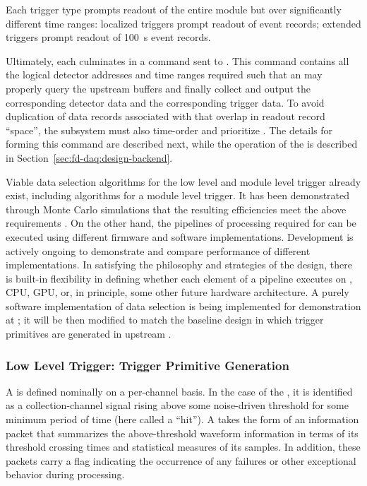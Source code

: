 \noindent Each trigger type prompts readout
of the entire module but over significantly different time
ranges: localized triggers prompt readout of \spreadout event records; extended
triggers prompt readout of \SI{100}{\second} event records. 

Ultimately, each  culminates in a command sent to . 
This command contains all the logical detector addresses and time ranges
required such that an  may properly query the upstream 
buffers and finally collect and output the corresponding detector data
and the corresponding trigger data. To avoid duplication of data
records associated with  that overlap in readout
record ``space'', the  subsystem must also time-order and
prioritize . The details for forming this
command are described next, while the operation of the  is
described in Section~\ref{sec:fd-daq:design-backend}.

Viable data selection algorithms for the low level and module level trigger already exist, including
algorithms for a module level  trigger.  It has
been demonstrated through Monte Carlo simulations that the resulting efficiencies meet the above
requirements \cite{bib:docdb11215,bib:docdb14522}. On the other hand, the pipelines of processing required
for  can be executed using different firmware and software
implementations. Development is actively ongoing to demonstrate
and compare performance of different implementations. In satisfying
the philosophy and strategies of the  design, there is built-in
flexibility in defining whether each element of a pipeline executes on
, CPU, GPU, or, in principle, some other future hardware
architecture. A purely software implementation of data selection is being
implemented for demonstration at ; it will be then
modified to match the baseline design in which trigger primitives are
generated in upstream  .


\subsubsection{Low Level Trigger: Trigger Primitive Generation}
\label{sec:sp-daq:design-trigger-primitives}

A  is defined nominally on a per-channel basis. In the case of
the  , it is identified as a
collection-channel signal rising above some noise-driven threshold for some minimum period of time (here called a
``hit'').
A  takes the form of an information packet that 
summarizes the above-threshold waveform information in terms of its
threshold crossing times and statistical measures of its  samples. 
In addition, these packets carry a flag indicating the occurrence of any
failures or other exceptional behavior during  processing.

